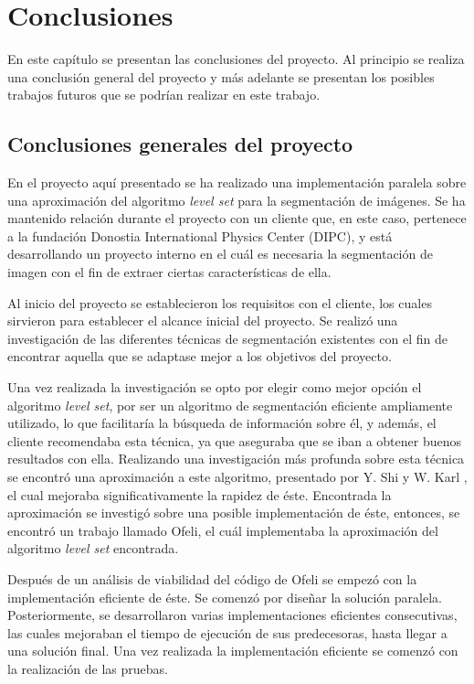 \chapter{Conclusiones}

En este cap\'{i}tulo se presentan las conclusiones del proyecto. Al principio se realiza una conclusi\'{o}n general del proyecto y m\'{a}s adelante se presentan los posibles trabajos futuros que se podr\'{i}an realizar en este trabajo.

\section{Conclusiones generales del proyecto}

En el proyecto aqu\'{i} presentado se ha realizado una implementaci\'{o}n paralela sobre una aproximaci\'{o}n del algoritmo \textit{level set} para la segmentaci\'{o}n de im\'{a}genes. Se ha mantenido relaci\'{o}n durante el proyecto con un cliente que, en este caso, pertenece a la fundaci\'{o}n Donostia International Physics Center (DIPC), y est\'{a} desarrollando un proyecto interno en el cu\'{a}l es necesaria la segmentaci\'{o}n de imagen con el fin de extraer ciertas caracter\'{i}sticas de ella. 

Al inicio del proyecto se establecieron los requisitos con el cliente, los cuales sirvieron para establecer el alcance inicial del proyecto. Se realiz\'{o} una investigaci\'{o}n de las diferentes t\'{e}cnicas de segmentaci\'{o}n existentes con el fin de encontrar aquella que se adaptase mejor a los objetivos del proyecto. 

Una vez realizada la investigaci\'{o}n se opto por elegir como mejor opci\'{o}n el algoritmo \textit{level set}, por ser un algoritmo de segmentaci\'{o}n eficiente ampliamente utilizado, lo que facilitar\'{i}a la b\'{u}squeda de informaci\'{o}n sobre \'{e}l, y adem\'{a}s, el cliente recomendaba esta t\'{e}cnica, ya que aseguraba que se iban a obtener buenos resultados con ella. Realizando una investigaci\'{o}n m\'{a}s profunda sobre esta t\'{e}cnica se encontr\'{o} una aproximaci\'{o}n a este algoritmo, presentado por Y. Shi y W. Karl \cite{yong1}, el cual mejoraba significativamente la rapidez de \'{e}ste. Encontrada la aproximaci\'{o}n se investig\'{o} sobre una posible implementaci\'{o}n de \'{e}ste, entonces, se encontr\'{o} un trabajo llamado Ofeli, el cu\'{a}l implementaba la aproximaci\'{o}n del algoritmo \textit{level set} encontrada.

Despu\'{e}s de un an\'{a}lisis de viabilidad del c\'{o}digo de Ofeli se empez\'{o} con la implementaci\'{o}n eficiente de \'{e}ste. Se comenz\'{o} por dise\~{n}ar la soluci\'{o}n paralela. Posteriormente, se desarrollaron varias implementaciones eficientes consecutivas, las cuales mejoraban el tiempo de ejecuci\'{o}n de sus predecesoras, hasta llegar a una soluci\'{o}n final. Una vez realizada la implementaci\'{o}n eficiente se comenz\'{o} con la realizaci\'{o}n de las pruebas.

